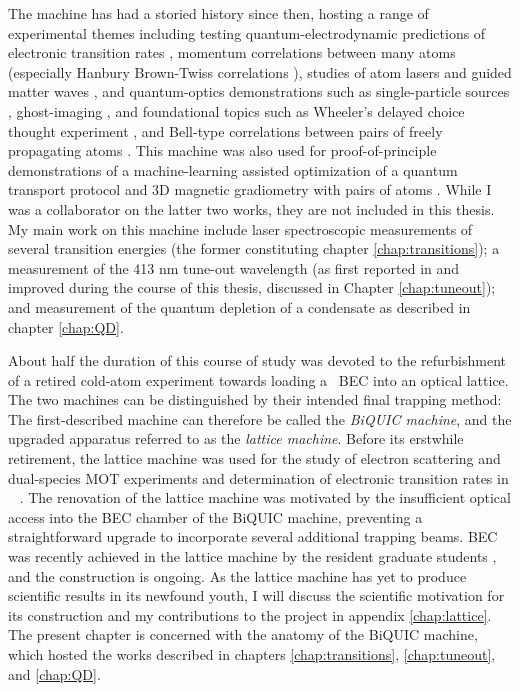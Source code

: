 	The machine has had a storied history since then, hosting a range of experimental themes including testing quantum-electrodynamic predictions of electronic transition rates \cite{Dall08}, momentum correlations between many atoms \cite{Hodgman17,Dall13,Manning13} (especially Hanbury Brown-Twiss correlations \cite{Manning10,Dall11a,Hodgman11,Rugway11,Rugway13}), studies of atom lasers \cite{Dall07_laser,Dall08a,Henson18_BCR,Manning10} and guided matter waves \cite{Dall10, Dall11a,Dall11}, and quantum-optics demonstrations such as single-particle sources \cite{Manning14}, ghost-imaging \cite{Khakimov16,Hodgman19}, and foundational topics such as Wheeler's delayed choice thought experiment \cite{Manning15}, and Bell-type correlations between pairs of freely propagating atoms \cite{Shin19}.
	This machine was also used for proof-of-principle demonstrations of a machine-learning assisted optimization of a quantum transport protocol \cite{Henson18_ML} and 3D magnetic gradiometry with pairs of atoms \cite{Shin20}.
	While I was a collaborator on the latter two works, they are not included in this thesis.
	My main work on this machine include laser spectroscopic measurements of several transition energies \cite{Ross20,Thomas20} (the former constituting chapter \ref{chap:transitions}); a measurement of the 413 nm tune-out wavelength (as first reported in \cite{Henson15} and improved during the course of this thesis, discussed in Chapter \ref{chap:tuneout}); and measurement of the quantum depletion of a condensate as described in chapter \ref{chap:QD}.
	

	About half the duration of this course of study was devoted to the refurbishment of a retired cold-atom experiment towards loading a \mhe~BEC into an optical lattice.
	The two machines can be distinguished by their intended final trapping method: The first-described machine can therefore be called the \emph{BiQUIC machine}, and the upgraded apparatus referred to as the \emph{lattice machine}.
	Before its erstwhile retirement, the lattice machine was used for the study of electron scattering and  dual-species MOT experiments \cite{Uhlmann05,Byron10,Byron10a} and determination of electronic transition rates in \mhe~\cite{Hodgman09_23P} .
	The renovation of the lattice machine was motivated by the insufficient optical access into the BEC chamber of the BiQUIC machine, preventing a straightforward upgrade to incorporate several additional trapping beams.
	BEC was recently achieved in the lattice machine by the resident graduate students \cite{Abbas21}, and the construction is ongoing.
	As the lattice machine has yet to produce scientific results in its newfound youth, I will discuss the scientific motivation for its construction and my contributions to the project in appendix \ref{chap:lattice}.
	The present chapter is concerned with the anatomy of the BiQUIC machine, which hosted the works described in chapters \ref{chap:transitions}, \ref{chap:tuneout}, and \ref{chap:QD}.

